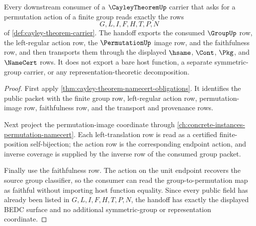 \begin{theorem}
\label{thm:cayley-theorem-permutation-action-handoff}
Every downstream consumer of a $\CayleyTheoremUp$ carrier that asks for a
permutation action of a finite group reads exactly the rows
$$
G,L,I,F,H,T,P,N
$$
of \autoref{def:cayley-theorem-carrier}. The handoff exports the consumed
$\GroupUp$ row, the left-regular action row, the $\PermutationUp$ image row,
and the faithfulness row, and then transports them through the displayed
$\hsame$, $\Cont$, $\Pkg$, and $\NameCert$ rows. It does not export a bare host
function, a separate symmetric-group carrier, or any representation-theoretic
decomposition.
\end{theorem}
\begin{proof}
First apply \autoref{thm:cayley-theorem-namecert-obligations}. It identifies
the public packet with the finite group row, left-regular action row,
permutation-image row, faithfulness row, and the transport and provenance rows.

Next project the permutation-image coordinate through
\autoref{ch:concrete-instances-permutation-namecert}. Each left-translation
row is read as a certified finite-position self-bijection; the action row is
the corresponding endpoint action, and inverse coverage is supplied by the
inverse row of the consumed group packet.

Finally use the faithfulness row. The action on the unit endpoint recovers the
source group classifier, so the consumer can read the group-to-permutation
map as faithful without importing host function equality. Since every public
field has already been listed in $G,L,I,F,H,T,P,N$, the handoff has exactly the
displayed BEDC surface and no additional symmetric-group or representation
coordinate.
\end{proof}


\begin{closurestatus}{\CayleyTheoremUp}
  \theoryclosure{\seedClosure}
  \formalstatus{\unformalizedV}
\end{closurestatus}

